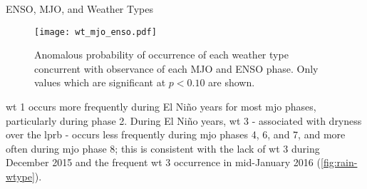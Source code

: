 \begin{block}{ENSO, MJO, and Weather Types}
    \begin{framed}
        \begin{figure}
            \centering
            \caption{
                Anomalous probability of occurrence of each weather type concurrent with observance of each MJO and ENSO phase.
                Only values which are significant at $p < 0.10$ are shown.
            }\label{fig:wt-mjo-ensoflooded}
            \texttt{[image: wt\_mjo\_enso.pdf]}
        \end{figure}
    \end{framed}
    \gls{wt} 1 occurs more frequently during El Ni\~{n}o years for most \gls{mjo} phases, particularly during phase 2.
    During El Ni\~no years, \gls{wt} 3 - associated with dryness over the \gls{lprb} - occurs less frequently during \gls{mjo} phases 4, 6, and 7, and more often during \gls{mjo} phase 8; this is consistent with the lack of \gls{wt} 3 during December 2015 and the frequent \gls{wt} 3 occurrence in mid-January 2016 (\cref{fig:rain-wtype}).
\end{block}
